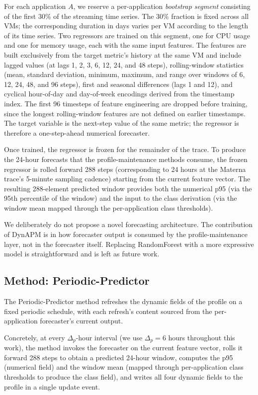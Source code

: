 \documentclass[manuscript,screen,review,anonymous]{acmart}
\begin{document}
For each application $A$, we reserve a per-application
\emph{bootstrap segment} consisting of the first 30\% of the
streaming time series. The 30\% fraction is fixed across all VMs;
the corresponding duration in days varies per VM according to the
length of its time series. Two regressors are trained on this
segment, one for CPU usage and one for memory usage, each with
the same input features. The features are built exclusively from
the target metric's history at the same VM and include lagged
values (at lags 1, 2, 3, 6, 12, 24, and 48 steps),
rolling-window statistics (mean, standard deviation, minimum,
maximum, and range over windows of 6, 12, 24, 48, and 96 steps),
first and seasonal differences (lags 1 and 12), and cyclical
hour-of-day and day-of-week encodings derived from the timestamp
index. The first 96 timesteps of feature engineering are dropped
before training, since the longest rolling-window features are
not defined on earlier timestamps. The target variable is the
next-step value of the same metric; the regressor is therefore a
one-step-ahead numerical forecaster.

Once trained, the regressor is frozen for the remainder of the
trace. To produce the 24-hour forecasts that the profile-maintenance
methods consume, the frozen regressor is rolled forward 288 steps
(corresponding to 24 hours at the Materna trace's 5-minute sampling
cadence) starting from the current feature vector. The resulting
288-element predicted window provides both the numerical p95
(via the 95th percentile of the window) and the input to the class
derivation (via the window mean mapped through the per-application
class thresholds).

We deliberately do not propose a novel forecasting architecture.
The contribution of DynAPM is in how forecaster output is consumed
by the profile-maintenance layer, not in the forecaster itself.
Replacing RandomForest with a more expressive model is
straightforward and is left as future work.

\subsection{Method: Periodic-Predictor}\label{sec:framework-pp}

The Periodic-Predictor method refreshes the dynamic fields of the
profile on a fixed periodic schedule, with each refresh's content
sourced from the per-application forecaster's current output.

Concretely, at every $\Delta_p$-hour interval (we use $\Delta_p = 6$
hours throughout this work), the method invokes the forecaster on
the current feature vector, rolls it forward 288 steps to obtain
a predicted 24-hour window, computes the p95 (numerical field) and
the window mean (mapped through per-application class thresholds
to produce the class field), and writes all four dynamic fields to
the profile in a single update event.
\end{document}
